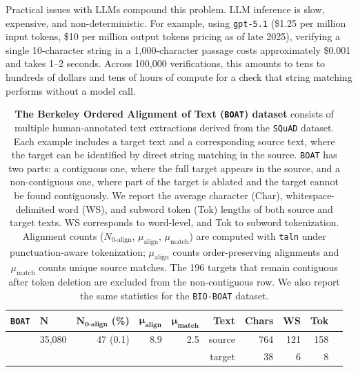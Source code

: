 \documentclass[10pt,twocolumn]{article}
\theoremstyle{plain}
\theoremstyle{definition}
\theoremstyle{remark}
\begin{document}
Practical issues with LLMs compound this problem. LLM inference is slow, expensive, and non-deterministic. For example, using \texttt{gpt-5.1} (\$1.25 per million input tokens, \$10 per million output tokens pricing as of late 2025), verifying a single 10-character string in a 1,000-character passage costs approximately \$0.001 and takes 1--2 seconds. Across 100,000 verifications, this amounts to tens to hundreds of dollars and tens of hours of compute for a check that string matching performs without a model call.

\begin{table}[t!]
  \centering
  \caption{
  \textbf{The Berkeley Ordered Alignment of Text (\texttt{BOAT}) dataset} consists of multiple human-annotated text extractions derived from the \texttt{SQuAD} dataset. Each example includes a target text and a corresponding source text, where the target can be identified by direct string matching in the source. \texttt{BOAT} has two parts: a contiguous one, where the full target appears in the source, and a non-contiguous one, where part of the target is ablated and the target cannot be found contiguously. We report the average character (Char), whitespace-delimited word (WS), and subword token (Tok) lengths of both source and target texts. WS corresponds to word-level, and Tok to subword tokenization. Alignment counts ($N_{\text{0-align}}$, $\mu_{\text{align}}$, $\mu_{\text{match}}$) are computed with \texttt{taln} under punctuation-aware tokenization; $\mu_{\text{align}}$ counts order-preserving alignments and $\mu_{\text{match}}$ counts unique source matches. The 196 targets that remain contiguous after token deletion are excluded from the non-contiguous row. We also report the same statistics for the \texttt{BIO-BOAT} dataset.
  }
  \begin{tabular}{llrrrrrrrr}
  \toprule
  \textbf{\texttt{BOAT}} & $\mathbf{N}$ & $\mathbf{N_{\text{0-align}}}$ (\%) & $\mathbf{\mu_{\text{align}}}$ & $\mathbf{\mu_{\text{match}}}$ & \textbf{Text} & \textbf{Chars} & \textbf{WS} & \textbf{Tok} \\ 
  \midrule
  
  \multirow{2}{*}{}
   Contiguous & 35{,}080 & 47 (0.1) & 8.9 & 2.5 & source & 764 & 121 & 158\\
              &          &     &     &     & target & 38  & 6 & 8 \\
  \midrule
  

\end{tabular}
\end{table}
\end{document}

